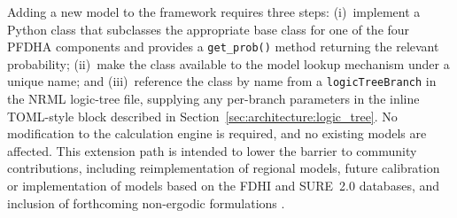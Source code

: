 Adding a new model to the framework requires three steps: (i)~implement a Python class that subclasses the appropriate base class for one of the four PFDHA components and provides a \texttt{get\_prob()} method returning the relevant probability; (ii)~make the class available to the model lookup mechanism under a unique name; and (iii)~reference the class by name from a \texttt{logicTreeBranch} in the NRML logic-tree file, supplying any per-branch parameters in the inline TOML-style block described in Section~\ref{sec:architecture:logic_tree}. No modification to the calculation engine is required, and no existing models are affected. This extension path is intended to lower the barrier to community contributions, including reimplementation of regional models, future calibration or implementation of models based on the FDHI and SURE~2.0 databases, and inclusion of forthcoming non-ergodic formulations \citep{Abrahamson2024}.



